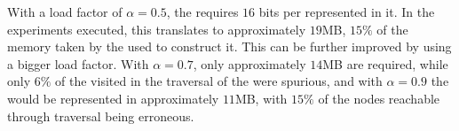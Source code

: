 With a load factor of $\alpha = 0.5$, the \dBHT requires $16$ bits per \kmer represented in it. In the experiments executed, this translates to approximately $19$MB, $15\%$ of the memory taken by the \dBCM used to construct it. This can be further improved by using a bigger load factor. With $\alpha = 0.7$, only approximately $14$MB are required, while only $6\%$ of the  visited in the traversal of the \dBHT were spurious, and with $\alpha = 0.9$ the \dBG would be represented in approximately $11$MB, with $15\%$ of the nodes reachable through traversal being erroneous.
